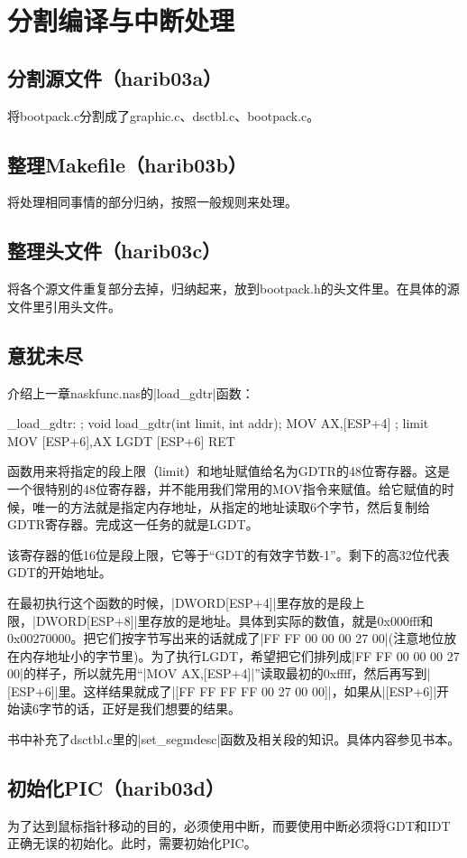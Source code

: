 ﻿\chapter{	分割编译与中断处理	}
\section{	分割源文件（harib03a）	}
将bootpack.c分割成了graphic.c、dsctbl.c、bootpack.c。
\section{	整理Makefile（harib03b）	}
将处理相同事情的部分归纳，按照一般规则来处理。
\section{	整理头文件（harib03c）	}
将各个源文件重复部分去掉，归纳起来，放到bootpack.h的头文件里。在具体的源文件里引用头文件。
\section{	意犹未尽	}
介绍上一章naskfunc.nas的|load_gdtr|函数：
\begin{code}
_load_gdtr:		; void load_gdtr(int limit, int addr);
		MOV		AX,[ESP+4]		; limit
		MOV		[ESP+6],AX
		LGDT	[ESP+6]
		RET
\end{code}
函数用来将指定的段上限（limit）和地址赋值给名为GDTR的48位寄存器。这是一个很特别的48位寄存器，并不能用我们常用的MOV指令来赋值。给它赋值的时候，唯一的方法就是指定内存地址，从指定的地址读取6个字节，然后复制给GDTR寄存器。完成这一任务的就是LGDT。

该寄存器的低16位是段上限，它等于“GDT的有效字节数-1”。剩下的高32位代表GDT的开始地址。

在最初执行这个函数的时候，|DWORD[ESP+4]|里存放的是段上限，|DWORD[ESP+8]|里存放的是地址。具体到实际的数值，就是0x000fff和0x00270000。把它们按字节写出来的话就成了|FF FF 00 00 00 27 00|(注意地位放在内存地址小的字节里)。为了执行LGDT，希望把它们排列成|FF FF 00 00 00 27 00|的样子，所以就先用“|MOV AX,[ESP+4]|”读取最初的0xffff，然后再写到|[ESP+6]|里。这样结果就成了|[FF FF FF FF 00 27 00 00]|，如果从|[ESP+6]|开始读6字节的话，正好是我们想要的结果。

书中补充了dsctbl.c里的|set_segmdesc|函数及相关段的知识。具体内容参见书本。
\section{	初始化PIC（harib03d）	}
为了达到鼠标指针移动的目的，必须使用中断，而要使用中断必须将GDT和IDT正确无误的初始化。此时，需要初始化PIC。


